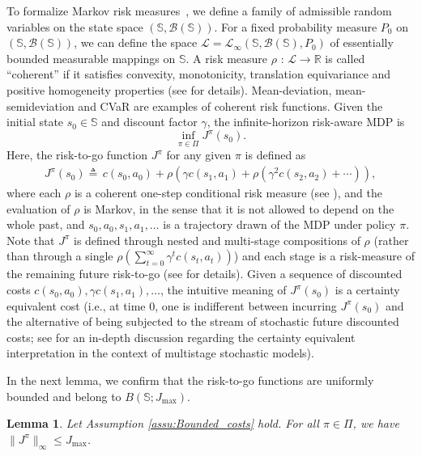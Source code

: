 \documentclass[12pt,technote,onecolumn]{IEEEtran}
\newtheorem{lemma}{Lemma}
\begin{document}
To formalize Markov risk measures~\cite{ruszczynski2010risk}, we define a family of admissible
random variables on the state space $\left(\mathbb{S},\mathcal{B}\left(\mathbb{S}\right)\right)$.
For a fixed probability measure $P_{0}$ on $\left(\mathbb{S},\mathcal{B}\left(\mathbb{S}\right)\right)$,
we can define the space $\mathcal{L}=\mathcal{L}_{\infty}\left(\mathbb{S},\mathcal{B}\left(\mathbb{S}\right),P_{0}\right)$
of essentially bounded measurable mappings on $\mathbb{S}$. A risk measure $\rho\mbox{ : }\mathcal{L}\rightarrow\mathbb{R}$ is
called ``coherent'' if it satisfies convexity, monotonicity, translation equivariance and positive homogeneity properties (see \cite{artzner1999coherent} for details). Mean-deviation, mean-semideviation and CVaR are examples of coherent risk functions. Given the initial state $s_{0}\in\mathbb{S}$ and discount factor $\gamma$, the infinite-horizon risk-aware MDP is
\begin{equation}
\inf_{\pi\in\Pi}J^{\pi}\left(s_{0}\right).\label{RISK}
\end{equation}
Here, the risk-to-go function $J^{\pi}$ for any given $\pi$
is defined as
\begin{equation}\label{iterated risk}
\begin{aligned}
J^{\pi}(s_{0})\triangleq\,c(s_0,a_0)+\rho(\gamma c(s_1,a_1)+\rho(\gamma^{2}c(s_2,a_2)+\cdots)),
\end{aligned}
\end{equation}
where each $\rho$ is a coherent one-step conditional risk measure (see \cite{ruszczynski2006conditional,ruszczynski2010risk}), and the evaluation of $\rho$ is Markov, in the sense that it is not allowed to depend on the whole past, and $s_0,a_0,s_1,a_1,\dots$ is a trajectory drawn of the MDP under policy $\pi$. Note that $J^{\pi}$ is defined through nested and multi-stage compositions of $\rho$ (rather than through a single $\rho(\sum_{t=0}^{\infty}\gamma^t c(s_t,a_t))$) and each stage is a risk-measure of the remaining future risk-to-go (see \cite{ruszczynski2010risk} for details). Given a sequence of discounted costs $c(s_0,a_0),\gamma c(s_1,a_1),\dots$, the intuitive meaning of $J^{\pi}(s_{0})$ is a certainty equivalent cost (i.e., at time $0$, one is indifferent between incurring $J^{\pi}(s_{0})$ and the alternative of being subjected to the stream of stochastic future discounted costs; see \cite{rudloff2014time} for an in-depth discussion regarding the certainty equivalent interpretation in the context of multistage stochastic models).

In the next lemma, we confirm that the risk-to-go functions are uniformly bounded and belong to $B(\mathbb{S};J_{\max})$. 
\begin{lemma}
	\label{lem:Bounded} Let Assumption \ref{assu:Bounded_costs}
	hold. For all $\pi\in\Pi$, we have $\|J^{\pi}\|_{\infty}\leq J_{\max}$.
\end{lemma}
\end{document}
